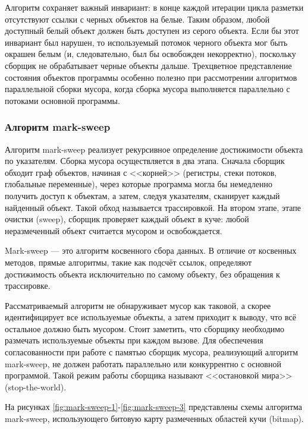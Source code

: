 Алгоритм сохраняет важный инвариант: в конце каждой итерации цикла разметки отсутствуют ссылки с черных объектов на белые. Таким образом, любой доступный белый объект должен быть доступен из серого объекта. Если бы этот инвариант был нарушен, то используемый потомок черного объекта мог быть окрашен белым (и, следовательно, был бы освобожден некорректно), поскольку сборщик не обрабатывает черные объекты дальше. Трехцветное представление состояния объектов программы особенно полезно при рассмотрении алгоритмов параллельной сборки мусора, когда сборка мусора выполняется параллельно с потоками основной программы. \cite{handbook}



\subsubsection{Алгоритм mark-sweep}
\label{mark-sweep}

Алгоритм mark-sweep реализует рекурсивное определение достижимости объекта по указателям. Сборка мусора осуществляется в два этапа. Сначала сборщик обходит граф объектов, начиная с <<корней>> (регистры, стеки потоков, глобальные переменные), через которые программа могла бы немедленно получить доступ к объектам, а затем, следуя указателям, сканирует каждый найденный объект. Такой обход называется трассировкой. На втором этапе, этапе очистки (sweep), сборщик проверяет каждый объект в куче: любой неразмеченный объект считается мусором и освобождается. \cite{handbook}

Mark-sweep --- это алгоритм косвенного сбора данных. В отличие от косвенных методов, прямые алгоритмы, такие как подсчёт ссылок, определяют достижимость объекта исключительно по самому объекту, без обращения к трассировке.  \cite{handbook}

Рассматриваемый алгоритм не обнаруживает мусор как таковой, а скорее идентифицирует все используемые объекты, а затем приходит к выводу, что всё остальное должно быть мусором. Стоит заметить, что сборщику необходимо размечать используемые объекты при каждом вызове. Для обеспечения согласованности при работе с памятью сборщик мусора, реализующий алгоритм mark-sweep, не должен работать параллельно или конкуррентно с основной программой. Такой режим работы сборщика называют <<остановкой мира>> (stop-the-world). \cite{handbook}

На рисунках \ref{fig:mark-sweep-1}-\ref{fig:mark-sweep-3} представлены схемы алгоритма mark-sweep, использующего битовую карту размеченных областей кучи (bitmap). \cite{handbook}

